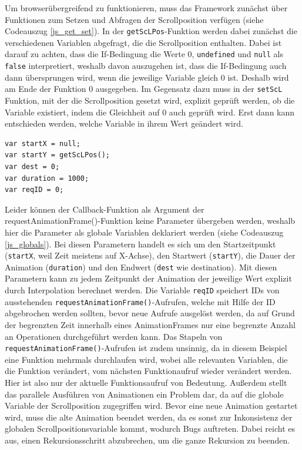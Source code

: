 Um browserübergreifend zu funktionieren, muss das Framework zunächst über Funktionen zum Setzen und Abfragen der Scrollposition verfügen (siehe Codeauszug \ref{js_get_set}). In der \lstinline{getScLPos}-Funktion werden dabei zunächst die verschiedenen Variablen abgefragt, die die Scrollposition enthalten. Dabei ist darauf zu achten, dass die If-Bedingung die Werte 0, \lstinline{undefined} und \lstinline{null} als \lstinline{false} interpretiert, weshalb davon auszugehen ist, dass die If-Bedingung auch dann übersprungen wird, wenn die jeweilige Variable gleich 0 ist. Deshalb wird am Ende der Funktion 0 ausgegeben. Im Gegensatz dazu muss in der \lstinline{setScL} Funktion, mit der die Scrollposition gesetzt wird, explizit geprüft werden, ob die Variable existiert, indem die Gleichheit auf 0 auch geprüft wird. Erst dann kann entschieden werden, welche Variable in ihrem Wert geändert wird.

\begin{lstlisting}[caption=Globale Variablen des Animationsframework., label=js_globals]
var startX = null;
var startY = getScLPos();
var dest = 0;
var duration = 1000;
var reqID = 0;
\end{lstlisting}


Leider können der Callback-Funktion als Argument der requestAnimationFrame()-Funktion keine Parameter übergeben werden, weshalb hier die Parameter als globale Variablen deklariert werden (siehe Codeauszug \ref{js_globals}). Bei diesen Parametern handelt es sich um den Startzeitpunkt (\lstinline{startX}, weil Zeit meistens auf X-Achse), den Startwert (\lstinline{startY}), die Dauer der Animation (\lstinline{duration}) und den Endwert (\lstinline{dest} wie destination). Mit diesen Parametern kann zu jedem Zeitpunkt der Animation der jeweilige Wert explizit durch Interpolation berechnet werden. Die Variable \lstinline{reqID} speichert IDs von ausstehenden \lstinline{requestAnimationFrame()}-Aufrufen, welche mit Hilfe der ID abgebrochen werden sollten, bevor neue Aufrufe ausgelöst werden, da auf Grund der begrenzten Zeit innerhalb eines AnimationFrames nur eine begrenzte Anzahl an Operationen durchgeführt werden kann. Das Stapeln von \lstinline{requestAnimationFrame()}-Aufrufen ist zudem unsinnig, da in diesem Beispiel eine Funktion mehrmals durchlaufen wird, wobei alle relevanten Variablen, die die Funktion verändert, vom nächsten Funktionaufruf wieder verändert werden. Hier ist also nur der aktuelle Funktionsaufruf von Bedeutung. Außerdem stellt das parallele Ausführen von Animationen ein Problem dar, da auf die globale Variable der Scrollposition zugegriffen wird. Bevor eine neue Animation gestartet wird, muss die alte Animation beendet werden, da es sonst zur Inkonsistenz der globalen Scrollpositionsvariable kommt, wodurch Bugs auftreten. Dabei reicht es aus, einen Rekursionsschritt abzubrechen, um die ganze Rekursion zu beenden.

